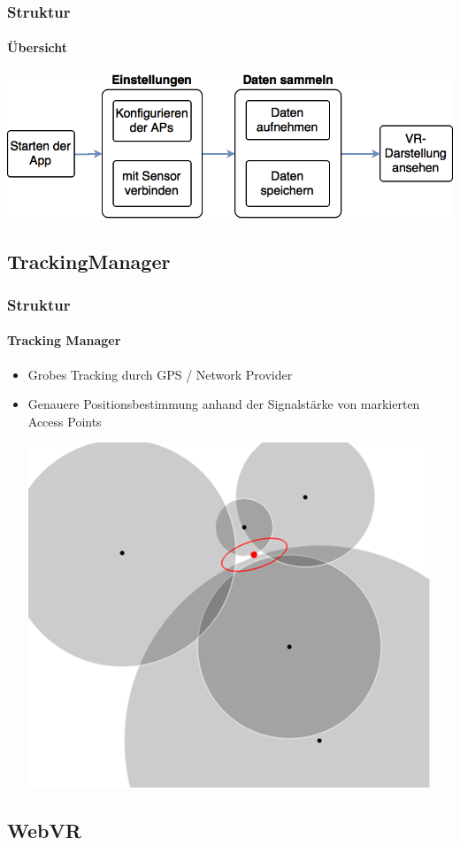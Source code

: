 \documentclass{beamer}
\begin{document}
\begin{frame}
\frametitle{Struktur}
\framesubtitle{Übersicht}
	\includegraphics[width=\textwidth]{diagram/flow.png}
\end{frame}

\subsection{TrackingManager}

\begin{frame}
\frametitle{Struktur}
\framesubtitle{Tracking Manager}
\begin{itemize}
  	\item	Grobes Tracking durch GPS / Network Provider \pause
 	\item 	Genauere Positionsbestimmung anhand der Signalstärke von markierten Access Points
			\begin{center}
			\includegraphics[scale=0.5]{trilateration.png}
			\end{center}
\end{itemize}
\end{frame}

\subsection{WebVR}
\end{document}

